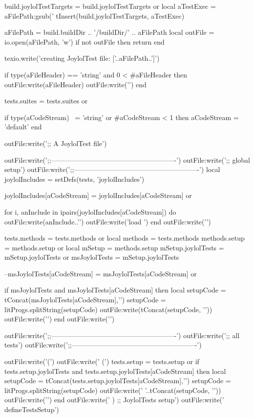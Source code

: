   build.joylolTestTargets = build.joylolTestTargets or { }
  local aTestExec = aFilePath:gsub('%
  tInsert(build.joylolTestTargets, aTestExec)

  aFilePath = build.buildDir .. '/buildDir/' .. aFilePath
  local outFile = io.open(aFilePath, 'w')
  if not outFile then
    return
  end
  
  texio.write('creating JoylolTest file: ['..aFilePath..']\n')
  
  if type(aFileHeader) == 'string'
    and 0 < #aFileHeader then
    outFile:write(aFileHeader)
    outFile:write('\n\n')
  end

  tests.suites = tests.suites or { }

  if type(aCodeStream) ~= 'string'
    or #aCodeStream < 1 then
    aCodeStream = 'default'
  end

  outFile:write(';; A JoylolTest file\n\n')
  
  outFile:write(';;-------------------------------------------------------\n')
  outFile:write(';; global setup\n')
  outFile:write(';;-------------------------------------------------------\n\n')
  local joylolIncludes = setDefs(tests, 'joylolIncludes')

  joylolIncludes[aCodeStream] = joylolIncludes[aCodeStream] or { }

  for i, anInclude in ipairs(joylolIncludes[aCodeStream]) do
    outFile:write(anInclude..'\n')
    outFile:write('load \n\n')
  end
  outFile:write('\n')

  tests.methods = tests.methods or { }
  local methods = tests.methods
  methods.setup = methods.setup or { }
  local mSetup  = methods.setup
  mSetup.joylolTests = mSetup.joylolTests or { }
  msJoylolTests      = mSetup.joylolTests

  --msJoylolTests[aCodeStream] = msJoylolTests[aCodeStream] or { }
  
  if msJoylolTests and
    msJoylolTests[aCodeStream] then
    local setupCode = tConcat(msJoylolTests[aCodeStream],'\n')
    setupCode       = litProgs.splitString(setupCode)
    outFile:write(tConcat(setupCode, '\n'))
    outFile:write('\n')
  end
  outFile:write('\n')

  outFile:write(';;-------------------------------------------------------\n')
  outFile:write(';; all tests\n')
  outFile:write(';;-------------------------------------------------------\n')

  outFile:write('(\n')
  outFile:write('  (\n')
  tests.setup = tests.setup or { }
  if tests.setup.joylolTests and
    tests.setup.joylolTests[aCodeStream] then
    local setupCode = tConcat(tests.setup.joylolTests[aCodeStream],'\n')
    setupCode       = litProgs.splitString(setupCode)
    outFile:write('  '..tConcat(setupCode, '\n  '))
    outFile:write('\n')
  end
  outFile:write('  ) ;; JoylolTests setup\n')
  outFile:write('  defineTestsSetup\n\n')


